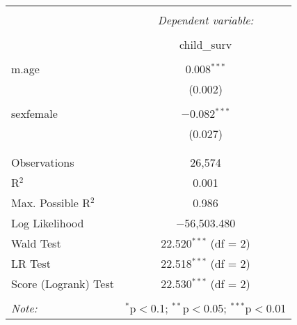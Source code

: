 
\begin{table}[!htbp] \centering 
  \caption{} 
  \label{} 
\begin{tabular}{@{\extracolsep{5pt}}lc} 
\\[-1.8ex]\hline 
\hline \\[-1.8ex] 
 & \multicolumn{1}{c}{\textit{Dependent variable:}} \\ 
\cline{2-2} 
\\[-1.8ex] & child\_surv \\ 
\hline \\[-1.8ex] 
 m.age & 0.008$^{***}$ \\ 
  & (0.002) \\ 
  & \\ 
 sexfemale & $-$0.082$^{***}$ \\ 
  & (0.027) \\ 
  & \\ 
\hline \\[-1.8ex] 
Observations & 26,574 \\ 
R$^{2}$ & 0.001 \\ 
Max. Possible R$^{2}$ & 0.986 \\ 
Log Likelihood & $-$56,503.480 \\ 
Wald Test & 22.520$^{***}$ (df = 2) \\ 
LR Test & 22.518$^{***}$ (df = 2) \\ 
Score (Logrank) Test & 22.530$^{***}$ (df = 2) \\ 
\hline 
\hline \\[-1.8ex] 
\textit{Note:}  & \multicolumn{1}{r}{$^{*}$p$<$0.1; $^{**}$p$<$0.05; $^{***}$p$<$0.01} \\ 
\end{tabular} 
\end{table}  
